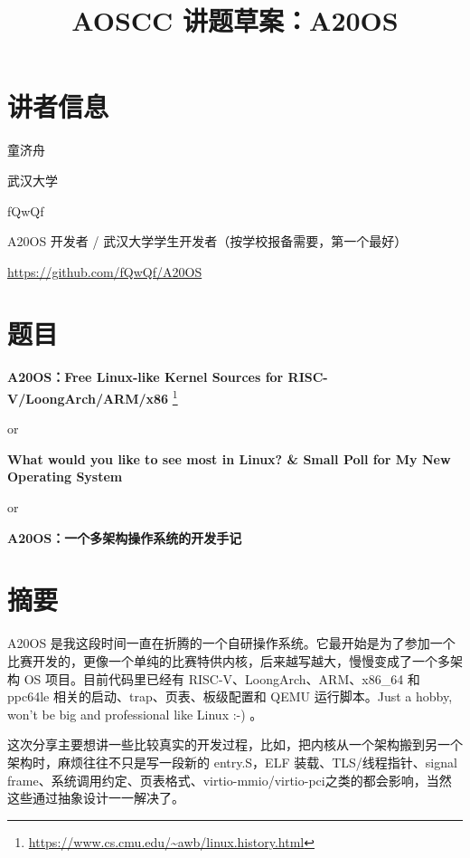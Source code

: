 \documentclass[UTF8,zihao=-4]{ctexart}
\title{AOSCC 讲题草案：A20OS}
\author{}
\date{}
\begin{document}
\maketitle

\section*{讲者信息}

\begin{description}[leftmargin=6em,style=nextline]
  \item[姓名] 童济舟
  \item[单位/院校] 武汉大学
  \item[宣发名称] fQwQf
  \item[宣发名义] A20OS 开发者 / 武汉大学学生开发者（按学校报备需要，第一个最好）
  \item[项目链接] \url{https://github.com/fQwQf/A20OS}
\end{description}

\section*{题目}

\textbf{A20OS：Free Linux-like Kernel Sources for RISC-V/LoongArch/ARM/x86} \footnote{\url{https://www.cs.cmu.edu/~awb/linux.history.html}}

or

\textbf{What would you like to see most in Linux? \& Small Poll for My New Operating System} \footnotemark[1]

or

\textbf{A20OS：一个多架构操作系统的开发手记}


\section*{摘要}

A20OS 是我这段时间一直在折腾的一个自研操作系统。它最开始是为了参加一个比赛开发的，更像一个单纯的比赛特供内核，后来越写越大，慢慢变成了一个多架构 OS 项目。目前代码里已经有 RISC-V、LoongArch、ARM、x86\_64 和 ppc64le 相关的启动、trap、页表、板级配置和 QEMU 运行脚本。Just a hobby, won't be big and professional like Linux :-) \footnotemark[1]。

这次分享主要想讲一些比较真实的开发过程，比如，把内核从一个架构搬到另一个架构时，麻烦往往不只是写一段新的 entry.S，ELF 装载、TLS/线程指针、signal frame、系统调用约定、页表格式、virtio-mmio/virtio-pci之类的都会影响，当然这些通过抽象设计一一解决了。
\end{document}
